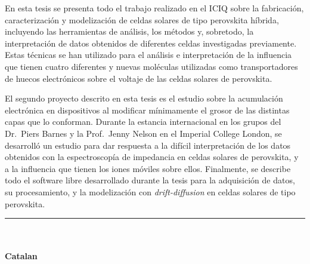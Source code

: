 En esta tesis se presenta todo el trabajo realizado en el ICIQ sobre la fabricación, caracterización y modelización de celdas solares de tipo perovskita híbrida, incluyendo las herramientas de análisis, los métodos y, sobretodo, la interpretación de datos obtenidos de diferentes celdas investigadas previamente.
Estas técnicas se han utilizado para el análisis e interpretación
de la influencia que tienen cuatro diferentes y nuevas moléculas
utilizadas como transportadores de huecos electrónicos sobre el voltaje
de las celdas solares de perovskita.

El segundo proyecto descrito en esta tesis es el estudio sobre la acumulación electrónica en dispositivos al modificar mínimamente el grosor de las distintas capas que lo conforman.
Durante la estancia internacional en los grupos del Dr.\ Piers Barnes y la Prof.\ Jenny Nelson en el Imperial College London, se desarrolló un estudio para dar respuesta a la difícil interpretación de los datos obtenidos con la espectroscopía de impedancia en celdas solares de perovskita, y a la influencia que tienen los iones móviles sobre ellos.
Finalmente, se describe todo el software libre desarrollado durante la tesis para la adquisición de datos, su procesamiento, y la modelización con \textsl{drift\hyp{}diffusion} en celdas solares de tipo perovskita.


{
	\vfill
	\centering \rule{5cm}{1pt}\\
	\vfill
}

\EnableQuotes
\noindent

\paragraph{Catalan}

